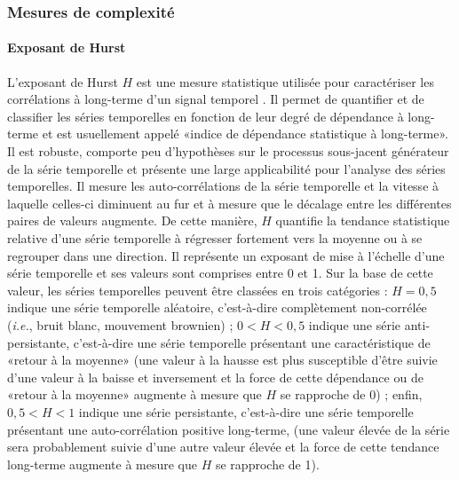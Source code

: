 \subsubsection{Mesures de complexité}
\label{mesurescomplexite}

\paragraph{Exposant de Hurst\\}
\label{hurst}

L'exposant de Hurst $H$ est une mesure statistique utilisée pour caractériser les corrélations à long-terme d'un signal temporel \citep{hurst1951long}. 
Il permet de quantifier et de classifier les séries temporelles en fonction de leur degré de dépendance à long-terme et est usuellement appelé «indice de dépendance statistique à long-terme». 
Il est robuste, comporte peu d'hypothèses sur le processus sous-jacent générateur de la série temporelle et présente une large applicabilité pour l'analyse des séries temporelles. 
Il mesure les auto-corrélations de la série temporelle et la vitesse à laquelle celles-ci diminuent au fur et à mesure que le décalage entre les différentes paires de valeurs augmente. 
De cette manière, $H$ quantifie la tendance statistique relative d'une série temporelle à régresser fortement vers la moyenne ou à se regrouper dans une direction. 
Il représente un exposant de mise à l'échelle d'une série temporelle et ses valeurs sont comprises entre 0 et 1. 
Sur la base de cette valeur, les séries temporelles peuvent être classées en trois catégories : 
$H=0,5$ indique une série temporelle aléatoire, c'est-à-dire complètement non-corrélée (\textit{i.e.}, bruit blanc, mouvement brownien) ; 
$0<H<0,5$ indique une série anti-persistante, c'est-à-dire une série temporelle présentant une caractéristique de «retour à la moyenne» (une valeur à la hausse est plus susceptible d'être suivie d'une valeur à la baisse et inversement et la force de cette dépendance ou de «retour à la moyenne» augmente à mesure que $H$ se rapproche de 0) ; 
enfin, $0,5<H<1$ indique une série persistante, c'est-à-dire une série temporelle présentant une auto-corrélation positive long-terme, (une valeur élevée de la série sera probablement suivie d'une autre valeur élevée et la force de cette tendance long-terme augmente à mesure que $H$ se rapproche de 1).

